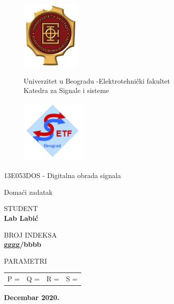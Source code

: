 

\thispagestyle{empty}
	
	\begin{figure}[ht]
			\includegraphics[width=2.9cm]{design/logo_ETF.png}
	   \endminipage
	   \begin{center}
	       \Large Univerzitet u Beogradu -Elektrotehnički fakultet \\ \Large Katedra za Signale i sisteme 
	   \end{center}
			
	   \endminipage
			\includegraphics[height = 3.2cm ,width=3.2cm]{design/logo_SIS.png}
		\endminipage
	\end{figure}
	
	\begin{center}
	\vspace{3.4cm}
	\LARGE
	13E053DOS - Digitalna obrada signala
	
	\vspace{0.8cm}
	\LARGE
	Domaći zadatak 
	
	
	\vspace{3cm}
	\normalsize	
	STUDENT \\
	\vspace{.3cm}
	\large
	\textbf{Lab Labić}
	
	\vspace{1.3cm}
	\normalsize	
	BROJ INDEKSA \\
	\vspace{.3cm}
	\large
	\textbf{gggg/bbbb}
	
	\vspace{1.3cm}
	\normalsize	
	PARAMETRI \\
	\vspace{.3cm}
	\large
    \begin{tabular}{c c c c}
         P = & Q = & R = & S =  \\
    \end{tabular}	
	
    \vspace{3.5cm}
	\large
	\textbf{Decembar 2020.}
	\end{center}
	
	\newpage